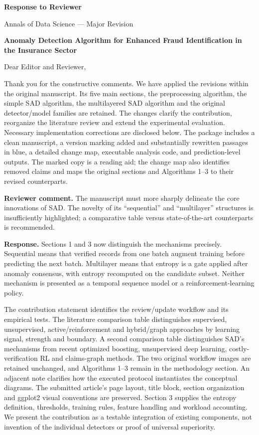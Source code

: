 \documentclass[11pt,a4paper]{article}
\newcommand{\commentbox}[1]{\par\medskip\noindent\colorbox{blue!6}{\parbox{\dimexpr\linewidth-2\fboxsep}{\textbf{Reviewer comment.} #1}}\par}
\begin{document}
\begin{center}
{\LARGE\bfseries Response to Reviewer}\par
\medskip
{\large Annals of Data Science --- Major Revision}\par
\medskip
\textbf{Anomaly Detection Algorithm for Enhanced Fraud Identification in the Insurance Sector}
\end{center}
Dear Editor and Reviewer,

Thank you for the constructive comments. We have applied the revisions
within the original manuscript. Its five main sections, the preprocessing
algorithm, the simple SAD algorithm, the multilayered SAD algorithm and the
original detector/model families are retained. The changes clarify the
contribution, reorganize the literature review and extend the experimental
evaluation. Necessary implementation corrections are disclosed below.
The package includes a clean manuscript, a version marking added and
substantially rewritten passages in blue, a detailed change map, executable
analysis code, and prediction-level outputs. The marked copy is a
reading aid; the change map also identifies removed claims and maps the
original sections and Algorithms 1--3 to their revised counterparts.

\commentbox{The manuscript must more sharply delineate the core innovations
of SAD. The novelty of its ``sequential'' and ``multilayer'' structures is
insufficiently highlighted; a comparative table versus state-of-the-art
counterparts is recommended.}

\textbf{Response.} Sections 1 and 3 now distinguish the mechanisms precisely.
Sequential means that verified records from one batch augment training
before predicting the next batch. Multilayer means that entropy is a gate
applied after anomaly consensus, with entropy recomputed on the candidate
subset. Neither mechanism is presented as a temporal sequence model or a
reinforcement-learning policy.

The contribution statement identifies the review/update workflow and its
empirical tests. The literature comparison table distinguishes supervised,
unsupervised, active/reinforcement and hybrid/graph approaches by learning
signal, strength and boundary. A second comparison table distinguishes
SAD's mechanisms from recent optimized boosting, unsupervised deep learning,
costly-verification RL and claims-graph methods. The two original workflow
images are retained unchanged, and Algorithms 1--3 remain in the methodology
section. An adjacent note clarifies how the executed protocol instantiates
the conceptual diagrams. The submitted article's page layout, title block,
section organization and ggplot2 visual conventions are preserved.
Section 3 supplies the entropy definition, thresholds, training rules,
feature handling and workload accounting. We present the contribution as a
testable integration of existing components, not invention of the individual
detectors or proof of universal superiority.
\end{document}

